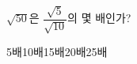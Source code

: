 $\sqrt{50}$은 $\dfrac{\sqrt{5}}{\sqrt{10}}$의 몇 배인가?
\begin{choices32}{5배}{10배}{15배}{20배}{25배}\end{choices32}
